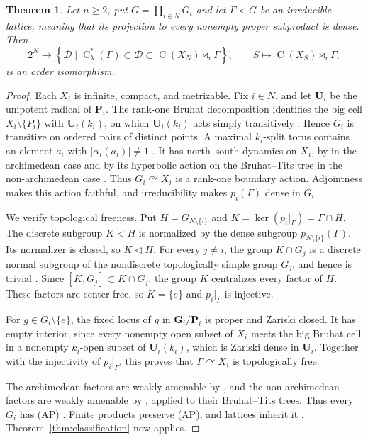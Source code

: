 \documentclass[11pt]{amsart}
\numberwithin{equation}{section}
\newcommand{\rC}{\operatorname{C}}
\newtheorem{theorem}{Theorem}[section]
\theoremstyle{definition}
\begin{document}
	\begin{theorem}
		\label{thm:dani-mixed-local-fields}
		Let $n\geq2$, put $G=\prod_{i\in N}G_i$ and let $\Gamma<G$ be an
		irreducible lattice, meaning that its projection to every nonempty proper
		subproduct is dense. Then
		\[
		2^N\longrightarrow
		\left\{\mathcal D\mid
		\rC^*_{\lambda}(\Gamma)\subset\mathcal D\subset
		\rC(X_N)\rtimes_r\Gamma\right\},
		\qquad
		S\longmapsto\rC(X_S)\rtimes_r\Gamma,
		\]
		is an order isomorphism.
	\end{theorem}
	
	\begin{proof}
		Each $X_i$ is infinite, compact, and metrizable. Fix $i\in N$, and let
		$\mathbf U_i$ be the unipotent radical of $\mathbf P_i$. The rank-one Bruhat
		decomposition identifies the big cell $X_i\setminus\{P_i\}$ with
		$\mathbf U_i(k_i)$, on which $\mathbf U_i(k_i)$ acts simply transitively
		\cite[Theorem~5.15]{BT65}. Hence $G_i$ is transitive on ordered pairs of
		distinct points. A maximal $k_i$-split torus contains an element $a_i$ with
		$|\alpha_i(a_i)|\neq1$ \cite[Theorem~7.2]{BT65}. It has north--south dynamics
		on $X_i$, by \cite[Sections~3.3 and~3.5]{Be97} in the archimedean case and by
		its hyperbolic action on the Bruhat--Tits tree in the non-archimedean case
		\cite{BT72}. Thus $G_i\curvearrowright X_i$ is a rank-one boundary action.
		Adjointness makes this action faithful, and irreducibility makes
		$p_i(\Gamma)$ dense in $G_i$.

		We verify topological freeness. Put $H=G_{N\setminus\{i\}}$ and
		$K=\ker(p_i|_\Gamma)=\Gamma\cap H$. The discrete subgroup $K<H$ is
		normalized by the dense subgroup $p_{N\setminus\{i\}}(\Gamma)$. Its
		normalizer is closed, so $K\lhd H$. For every $j\neq i$, the group
		$K\cap G_j$ is a discrete normal subgroup of the nondiscrete topologically
		simple group $G_j$, and hence is trivial
		\cite[Theorem~I.1.5.6(i)]{Ma91}. Since $[K,G_j]\subset K\cap G_j$, the group
		$K$ centralizes every factor of $H$. These factors are center-free, so
		$K=\{e\}$ and $p_i|_\Gamma$ is injective.

		For $g\in G_i\setminus\{e\}$, the fixed locus of $g$ in
		$\mathbf G_i/\mathbf P_i$ is proper and Zariski closed. It has empty interior,
		since every nonempty open subset of $X_i$ meets the big Bruhat cell in a
		nonempty $k_i$-open subset of $\mathbf U_i(k_i)$, which is Zariski dense in
		$\mathbf U_i$. Together with the injectivity of $p_i|_\Gamma$, this proves that
		$\Gamma\curvearrowright X_i$ is topologically free.
		
		The archimedean factors are weakly amenable by \cite[Main theorem]{CH89}, and
		the non-archimedean factors are weakly amenable by \cite[Theorem~6]{Sz91},
		applied to their Bruhat--Tits trees. Thus every $G_i$ has {\rm(AP)}
		\cite[Theorem~1.12]{HK94}. Finite products preserve {\rm(AP)}, and lattices
		inherit it \cite[Theorems~1.15 and~2.4]{HK94}. Theorem~\ref{thm:classification}
		now applies.
	\end{proof}
	
\end{document}
